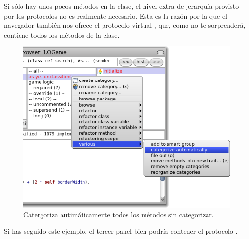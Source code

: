 \documentclass[a4paper,10pt,twoside]{book}
\begin{document}
Si s\'olo hay unos pocos m\'etodos en la clase, el nivel extra de jerarqu\'ia provisto por los protocolos no es realmente necesario.
Esta es la raz\'on por la que el navegador tambi\'en nos ofrece el protocolo virtual , que, como no te sorprender\'a, contiene todos los m\'etodos de la clase.

\begin{figure}[htbp]
   \centering
   \includegraphics[width=\textwidth]{Categorize} 
   \caption{Catergoriza autim\'aticamente todos los m\'etodos sin categorizar.}
\end{figure}

Si has seguido este ejemplo, el tercer panel bien podr\'ia contener el protocolo .
\end{document}
